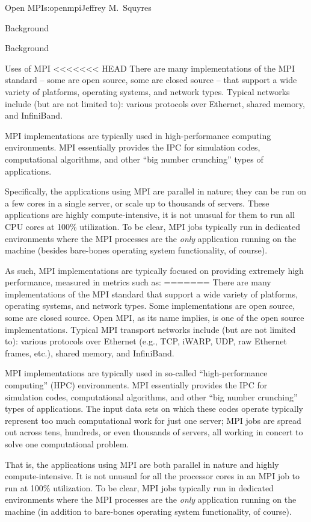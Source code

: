 \begin{aosachapter}{Open MPI}{s:openmpi}{Jeffrey M.\ Squyres}
\begin{aosasect1}{Background}
\begin{aosasect1}{Background}
\begin{aosasect2}{Uses of MPI}
<<<<<<< HEAD
There are many implementations of the MPI standard -- some are open
source, some are closed source -- that support a wide variety of
platforms, operating systems, and network types.  
%
Typical networks include (but are not limited to): various protocols
over Ethernet, shared memory, and InfiniBand.

MPI implementations are typically used in high-performance computing
environments.  MPI essentially provides the IPC for simulation codes,
computational algorithms, and other ``big number crunching'' types of
applications.

Specifically, the applications using MPI are parallel in nature; they
can be run on a few cores in a single server, or scale up to thousands
of servers.  These applications are highly compute-intensive, it is
not unusual for them to run all CPU cores at 100\% utilization.  To be
clear, MPI jobs typically run in dedicated environments where the MPI
processes are the {\em only} application running on the machine
(besides bare-bones operating system functionality, of course).

As such, MPI implementations are typically focused on providing
extremely high performance, measured in metrics such as:
=======
There are many implementations of the MPI standard that support a
wide variety of platforms, operating systems, and network types.
Some implementations are open source, some are closed source.  
%
Open MPI, as its name implies, is one of the open source
implementations.
%
Typical MPI transport networks include (but are not limited to):
various protocols over Ethernet (e.g., TCP, iWARP, UDP, raw Ethernet
frames, etc.), shared memory, and InfiniBand.

MPI implementations are typically used in so-called ``high-performance
computing'' (HPC) environments.  MPI essentially provides the IPC for
simulation codes, computational algorithms, and other ``big number
crunching'' types of applications.  The input data sets on which these
codes operate typically represent too much computational work for just
one server; MPI jobs are spread out across tens, hundreds, or even
thousands of servers, all working in concert to solve one
computational problem.

That is, the applications using MPI are both parallel in nature and
highly compute-intensive.  It is not unusual for all the processor
cores in an MPI job to run at 100\% utilization.  To be clear, MPI
jobs typically run in dedicated environments where the MPI processes
are the \emph{only} application running on the machine (in addition to
bare-bones operating system functionality, of course).


\end{aosasect2}
\end{aosasect1}
\end{aosasect1}
\end{aosachapter}
